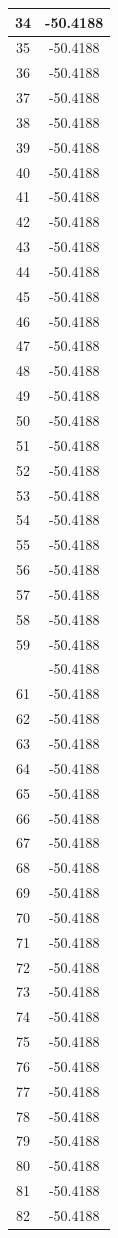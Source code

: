 \documentclass[12pt,a4paper]{article}
\numberwithin{equation}{section}
\numberwithin{figure}{section}
\numberwithin{table}{section}
\begin{document}
\begin{longtable}{|c|c|}
34 & -50.4188 \\ \hline
35 & -50.4188 \\ \hline
36 & -50.4188 \\ \hline
37 & -50.4188 \\ \hline
38 & -50.4188 \\ \hline
39 & -50.4188 \\ \hline
40 & -50.4188 \\ \hline
41 & -50.4188 \\ \hline
42 & -50.4188 \\ \hline
43 & -50.4188 \\ \hline
44 & -50.4188 \\ \hline
45 & -50.4188 \\ \hline
46 & -50.4188 \\ \hline
47 & -50.4188 \\ \hline
48 & -50.4188 \\ \hline
49 & -50.4188 \\ \hline
50 & -50.4188 \\ \hline
51 & -50.4188 \\ \hline
52 & -50.4188 \\ \hline
53 & -50.4188 \\ \hline
54 & -50.4188 \\ \hline
55 & -50.4188 \\ \hline
56 & -50.4188 \\ \hline
57 & -50.4188 \\ \hline
58 & -50.4188 \\ \hline
59 & -50.4188 \\ \hline
\pagebreak
60 & -50.4188 \\ \hline
61 & -50.4188 \\ \hline
62 & -50.4188 \\ \hline
63 & -50.4188 \\ \hline
64 & -50.4188 \\ \hline
65 & -50.4188 \\ \hline
66 & -50.4188 \\ \hline
67 & -50.4188 \\ \hline
68 & -50.4188 \\ \hline
69 & -50.4188 \\ \hline
70 & -50.4188 \\ \hline
71 & -50.4188 \\ \hline
72 & -50.4188 \\ \hline
73 & -50.4188 \\ \hline
74 & -50.4188 \\ \hline
75 & -50.4188 \\ \hline
76 & -50.4188 \\ \hline
77 & -50.4188 \\ \hline
78 & -50.4188 \\ \hline
79 & -50.4188 \\ \hline
80 & -50.4188 \\ \hline
81 & -50.4188 \\ \hline
82 & -50.4188 \\ \hline
	\end{longtable}
	
\end{document}
